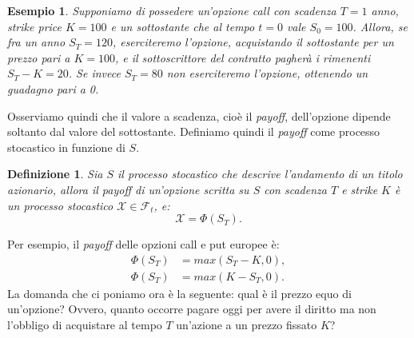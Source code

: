 \documentclass[a4paper,10pt]{report}
\newtheorem{definition}{Definizione}[chapter]
\theoremstyle{osservazione}
\theoremstyle{esempio}
\newtheorem{esempio}{Esempio}[chapter]
\theoremstyle{notazione}
\theoremstyle{corollario}
\begin{document}
\begin{esempio}
Supponiamo di possedere un'opzione \emph{call} con scadenza $T=1$ anno, \emph{strike price} $K=100$\officialeuro$ $ e un sottostante che al tempo $t=0$ vale $S_0=100$\officialeuro. Allora, se fra un anno $S_T=120$\officialeuro$ $, eserciteremo l'opzione, acquistando il sottostante per un prezzo pari a $K=100$\officialeuro$ $, e il sottoscrittore del contratto pagher\`a i rimenenti $S_T-K=20$\officialeuro$ $. Se invece $S_T=80$\officialeuro$ $ non eserciteremo l'opzione, ottenendo un guadagno pari a 0.
\end{esempio}
Osserviamo quindi che il valore a scadenza, cio\`e il \emph{payoff}, dell'opzione dipende soltanto dal valore del sottostante. Definiamo quindi il \emph{payoff} come processo stocastico in funzione di $S$.
\begin{definition}
Sia $S$ il processo stocastico che descrive l'andamento di un titolo azionario, allora il \emph{payoff} di un'opzione scritta su $S$ con scadenza $T$ e \emph{strike} $K$ \`e un processo stocastico $\mathcal{X}\in\mathcal{F}_t$, e: $$\mathcal{X}=\Phi(S_T).$$
\end{definition}
Per esempio, il \emph{payoff} delle opzioni call e put europee \`e:
\begin{align*}
\Phi(S_T)&=max(S_T-K,0),\\
\Phi(S_T)&=max(K-S_T,0).
\end{align*}
La domanda che ci poniamo ora \`e la seguente: qual \`e il prezzo equo di un'opzione? Ovvero, quanto occorre pagare oggi per avere il diritto ma non l'obbligo di acquistare al tempo $T$ un'azione a un prezzo fissato $K$?
\end{document}
